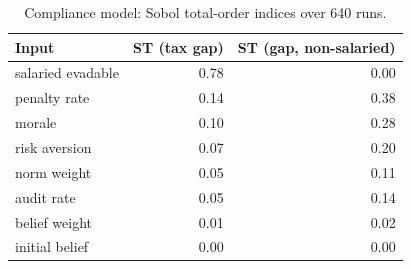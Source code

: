 \begin{table}[t]
\centering\small
\caption{Compliance model: Sobol total-order indices over 640 runs.}
\label{tab:behaviour_sobol}
\begin{tabular}{lrr}
\toprule
Input & ST (tax gap) & ST (gap, non-salaried) \\
\midrule
salaried evadable & 0.78 & 0.00 \\
penalty rate & 0.14 & 0.38 \\
morale & 0.10 & 0.28 \\
risk aversion & 0.07 & 0.20 \\
norm weight & 0.05 & 0.11 \\
audit rate & 0.05 & 0.14 \\
belief weight & 0.01 & 0.02 \\
initial belief & 0.00 & 0.00 \\
\bottomrule
\end{tabular}
\end{table}
